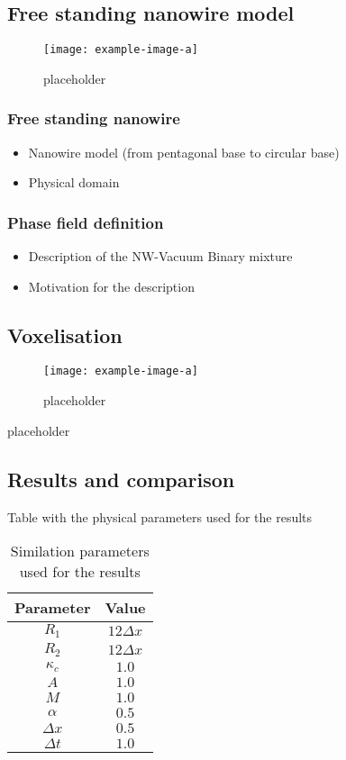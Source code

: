 \subsection{Free standing nanowire model}
\begin{figure}[H]
    \centering
    \texttt{[image: example-image-a]}
    \caption{placeholder}
    \label{fig:2-free-standing-nw}
\end{figure}
    \subsubsection{Free standing nanowire}
    \begin{itemize}
        \item Nanowire model (from pentagonal base to circular base)
        \item Physical domain
    \end{itemize}
    \subsubsection{Phase field definition}
    \begin{itemize}
        \item Description of the NW-Vacuum Binary mixture
        \item Motivation for the description
    \end{itemize}
\subsection{Voxelisation}
    \begin{figure}[H]
        \centering
        \texttt{[image: example-image-a]}
        \caption{placeholder}
        \label{fig:2-voxels}
    \end{figure}
    placeholder
\subsection{Results and comparison}
    Table with the physical parameters used for the results
    \begin{table}[H]
        \centering
        \begin{tabular}{|c|c|}
            \hline
            Parameter & Value \\
            \hline
            $R_1$ & $12 \Delta x$ \\
            $R_2$ & $12 \Delta x$ \\
            $\kappa_c$ & $1.0$ \\
            $A$ & $1.0$ \\
            $M$ & $1.0$ \\
            $\alpha$ & $0.5$ \\
            $\Delta x$ & $0.5$ \\
            $\Delta t$ & $1.0$ \\
            \hline
        \end{tabular}
        \caption{Similation parameters used for the results}
        \label{tab:2-parameters}
    \end{table}
